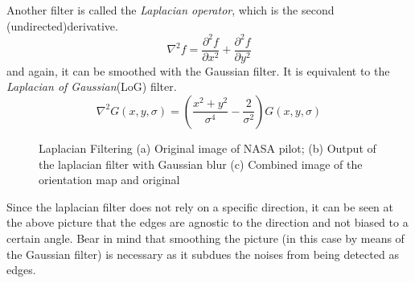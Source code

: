 \documentclass[twoside,a4paper,article]{combine}
\begin{document}
Another filter is called the \emph{Laplacian operator}, which is the second (undirected)derivative.\cite{Szeliski_2022}
\[
    \nabla^2 f = \frac{\partial^2 f}{\partial x^2} + \frac{\partial^2 f}{\partial y^2}
\]
and again, it can be smoothed with the Gaussian filter. It is equivalent to the \emph{Laplacian of Gaussian}(LoG) filter.
\[
    \nabla^2 G (x, y, \sigma) = (\frac{x^2 + y^2}{\sigma^4} - \frac{2}{\sigma^2}) G (x, y, \sigma)
\]
\begin{minipage}{\textwidth}\begin{figure}[H]
    \captionsetup{justification=centering}
    \centering
    \caption{Laplacian Filtering (a) Original image of NASA pilot\cite{NASA_on_The_Commons_1970}; (b) Output of the laplacian filter with Gaussian blur (c) Combined image of the orientation map and original}
    \label{fig:padding_borders}
\end{figure}\end{minipage}

Since the laplacian filter does not rely on a specific direction, it can be seen at the above picture that the edges are agnostic to the direction and not biased to a certain angle. Bear in mind that smoothing the picture (in this case by means of the Gaussian filter)
is necessary as it subdues the noises from being detected as edges.
\end{document}
